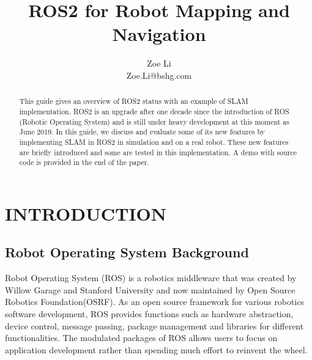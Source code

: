 \documentclass[letterpaper, 10 pt, conference]{ieeeconf}  %
\title{\LARGE \bf
ROS2 for Robot Mapping and Navigation
}
\author{Zoe Li \\
        Zoe.Li@bshg.com%
}
\begin{document}
\maketitle
\thispagestyle{empty}
\pagestyle{empty}
\begin{abstract}
 This guide gives an overview of ROS2 status with an example of SLAM implementation. ROS2 is an upgrade after one decade since the introduction of ROS (Robotic Operating System) and is still under heavy development at this moment as June 2019. In this guide, we discuss and evaluate some of its new features by implementing SLAM in ROS2 in simulation and on a real robot. These new features are briefly introduced and some are tested in this implementation. A demo with source code is provided in the end of the paper.
\end{abstract}
\section{INTRODUCTION}
\subsection{Robot Operating System Background}
Robot Operating System (ROS) is a robotics middleware that was created by Willow Garage and Stanford University and now maintained by Open Source Robotics Foundation(OSRF)\cite{c2}.  As an open source framework for various robotics software development, ROS provides functions such as hardware abstraction, device control, message passing, package management and libraries for different functionalities. The modulated packages of ROS allows users to focus on application development rather than spending much effort to reinvent the wheel.
\end{document}

